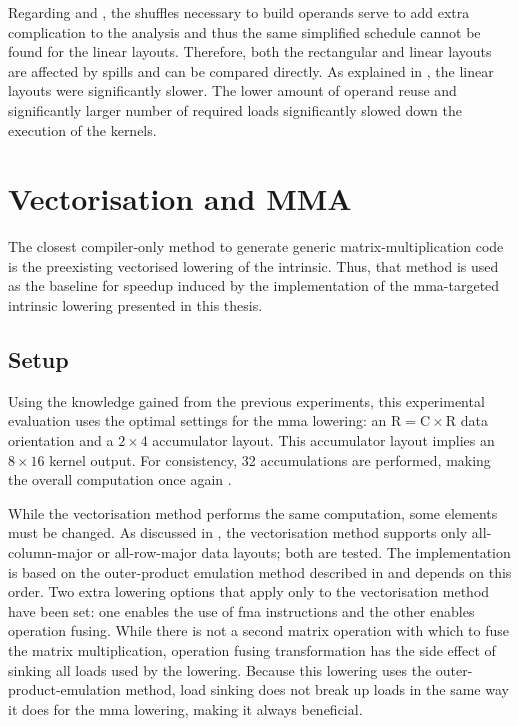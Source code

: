 \documentclass[\main/thesis.tex]{subfiles}
\begin{document}
Regarding  and , the shuffles necessary to build operands serve to add extra complication to the  analysis and thus the same simplified schedule cannot be found for the linear layouts.
Therefore, both the rectangular and linear layouts are affected by spills and can be compared directly.
As explained in , the linear layouts were significantly slower.
The lower amount of operand reuse and significantly larger number of required loads significantly slowed down the execution of the kernels.

\section{Vectorisation and MMA}
The closest compiler-only method to generate generic matrix-multiplication code is the preexisting vectorised \gls{lowering} of the  intrinsic.
Thus, that method is used as the baseline for speedup induced by the implementation of the \gls{mma}-targeted intrinsic \gls{lowering} presented in this thesis.

\subsection{Setup}
Using the knowledge gained from the previous experiments, this experimental evaluation uses the optimal settings for the \gls{mma} \gls{lowering}: an $\textrm{R} = \textrm{C} \times \textrm{R}$ data orientation and a $2 \times 4$ accumulator layout.\footnotemark
{}
This accumulator layout implies an  $8 \times 16$ kernel output.
For consistency, 32 accumulations are performed, making the overall computation once again .

While the vectorisation method performs the same computation, some elements must be changed.
As discussed in , the vectorisation method supports only all-column-major or all-row-major data layouts; both are tested.
The implementation is based on the outer-product emulation method described in  and depends on this order.
Two extra \gls{lowering} options that apply only to the vectorisation method have been set: one enables the use of \gls{fma} instructions and the other enables operation fusing.
While there is not a second matrix operation with which to fuse the matrix multiplication, operation fusing transformation has the side effect of sinking all loads used by the \gls{lowering}.
Because this \gls{lowering} uses the outer-product-emulation method, load sinking does not break up loads in the same way it does for the \gls{mma} \gls{lowering}, making it always beneficial.
\end{document}
